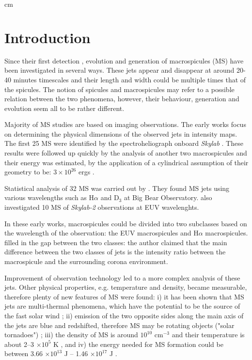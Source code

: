 \documentclass[final,authoryear,5p]{elsarticle}
\begin{document}
 cm
\section{Introduction}
Since their first detection \citep{bohlin1975}, evolution and generation of macrospicules (MS) have been investigated in several ways. These jets appear and disappear at around 20-40 minutes timescales and their length and width could be multiple times that of the spicules. The notion of spicules and macrospicules may refer to a possible relation between the two phenomena, however, their behaviour, generation and evolution seem all to be rather different.

Majority of MS studies are based on imaging observations. The early works focus on determining the physical dimensions of the observed jets in intensity maps. The first 25 MS were identified by the spectroheliograph onboard \textit{Skylab} \citep{bohlin1975}. These results were followed up quickly by the analysis of another two macrospicules and their energy was estimated, by the application of a cylindrical assumption of their geometry to be: $3 \times 10^{26}$ ergs \citep{withbroe1976}.
 
Statistical analysis of 32 MS was carried out by \cite{labonte1979}. They found MS jets using various wavelengths such as H$\alpha$ and D$_{\text{3}}$ at Big Bear Observatory. \cite{dere1989} also investigated 10 MS of \textit{Skylab-2} observations at EUV wavelenghts. 

In these early works, macrospicules could be divided into two subclasses based on the wavelength of the observation: the EUV macrospicules and H$\alpha$ macrospicules. \cite{shibata1982} filled in the gap between the two classes: the author claimed that the main difference between the two classes of jets is the intensity ratio between the macrospicule and the surrounding corona environment.

Improvement of observation technology led to a more complex analysis of these jets. Other physical properties, e.g. temperature and density, became measurable, therefore plenty of new features of MS were found: i) it has been shown that MS jets are multi-thermal phenomena, which have the potential to be the source of the fast solar wind \citep{pike1997}; ii) emission of the two opposite sides along the main axis of the jets are blue and redshifted, therefore MS may be rotating objects ("solar tornadoes") \citep{pike1998}; iii) the density of MS is around $10^{10}$ cm$^{-3}$ and their temperature is about 2--3 $\times 10^{5}$ K \citep{parenti2002}, and iv) the energy needed for MS formation could be between 3.66 $\times 10^{13}$ J -- 1.46 $\times 10^{17}$ J \citep{bennett2015}.
\end{document}
